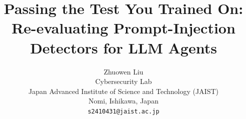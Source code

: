 \documentclass[letterpaper,twocolumn,10pt]{article}
\begin{document}
\date{}
\title{\Large \bf Passing the Test You Trained On:\\Re-evaluating Prompt-Injection Detectors for LLM Agents}
\author{
{\rm Zhuowen Liu}\\
Cybersecurity Lab\\
Japan Advanced Institute of Science and Technology (JAIST)\\
Nomi, Ishikawa, Japan\\
\texttt{s2410431@jaist.ac.jp}
}
\maketitle















{\footnotesize 
}

\appendix

\end{document}
